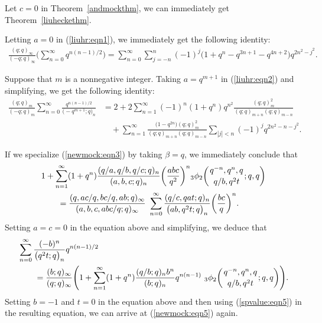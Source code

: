 \documentclass[pdftex]{sigma}
\numberwithin{equation}{section}
\begin{document}
Let $c=0$ in Theorem~\ref{andmockthm}, we can immediately get Theorem~\ref{liuheckethm}.

Letting $a=0$ in (\ref{liuhr:eqn1}), we immediately get the following identity:
\begin{align}\label{newmock:eqn5}
	\frac{(q; q)_\infty}{(-q; q)_\infty}
	\Biggl(\sum_{n=0}^\infty q^{n(n-1)/2}\Biggr)
	=\sum_{n=0}^\infty \sum_{j=-n}^n (-1)^{j}\bigl(1+q^n-q^{3n+1}-q^{4n+2}\bigr) q^{2n^2-j^2}.
\end{align}

Suppose that $m$ is a nonnegative integer. Taking $a=q^{m+1}$ in (\ref{liuhr:eqn2}) and simplifying, we get the following identity:
\begin{align*}%
	\frac{(q; q)_m}{(-q; q)_m}\sum_{n=0}^\infty \frac{q^{n(n-1)/2}}{\bigl(-q^{m+1}; q\bigr)_n}
	&{}=2+2\sum_{n=1}^\infty (-1)^n (1+q^n) q^{n^2}\frac{(q; q)^2_m}{(q; q)_{m+n} (q; q)_{m-n}}\\
	&\quad{} +\sum_{n=1}^\infty \frac{\bigl(1-q^{2n}\bigr) (q; q)^2_m}{(q; q)_{m+n} (q; q)_{m-n}} \sum_{|j|<n} (-1)^j q^{2n^2-n-j^2}. \nonumber
\end{align*}

If we specialize (\ref{newmock:eqn3}) by taking $\beta=q$, we immediately conclude that
\begin{align}
		&1+\sum_{n=1}^\infty (1+q^n) \frac{(q/a, q/b, q/c; q)_n}{(a, b, c; q)_n} \biggl(\frac{abc}{q^2}\biggr)^n {_3\phi_2}\biggl({{q^{-n}, q^n, q}\atop{q/b, q^2 t}}; q, q\biggr)\nonumber\\
		&\qquad{}=\frac{(q, ac/q, bc/q, ab; q)_\infty}{(a, b, c, abc/q; q)_\infty}~
		\sum_{n=0}^{\infty}\frac{(q/c, qat; q)_n}{\bigl(ab, q^2t; q\bigr)_n}\biggl(\frac{bc}{q}\biggr)^n.\label{newmock:eqn7}
	\end{align}	
Setting $a=c=0$ in the equation above and simplifying, we deduce that
\begin{align}
&\sum_{n=0}^{\infty}\frac{(-b)^n}{\bigl(q^2t; q\bigr)_n} q^{n(n-1)/2}\nonumber\\
&\qquad{}=\frac{(b; q)_\infty} {(q; q)_\infty}
\Biggl(1+\sum_{n=1}^{\infty} (1+q^n) \frac{(q/b; q)_n b^n}{(b; q)_n} q^{n(n-1)}~{_3\phi_2}\biggl({{q^{-n}, q^n, q}\atop{q/b, q^2 t}}; q, q\biggr)\Biggr).
\label{newmock:eqn8}
\end{align}
Setting $b=-1$ and $t=0$ in the equation above and then using (\ref{spvalue:eqn5}) in the resulting equation, we can arrive at (\ref{newmock:eqn5}) again.
\end{document}

